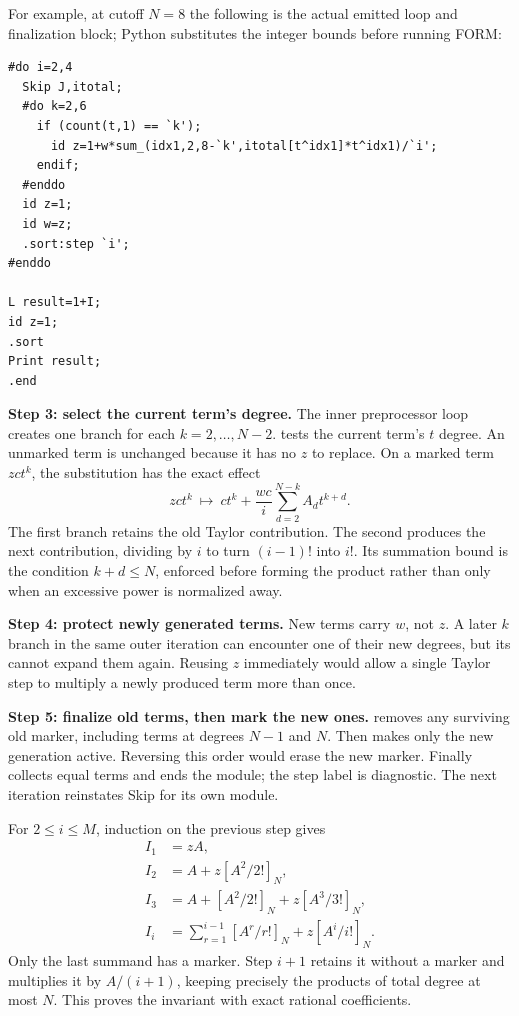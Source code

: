 \clearpage
{}
For example, at cutoff $N=8$ the following is the actual emitted loop and
finalization block; Python substitutes the integer bounds before running FORM:
\begin{lstlisting}
#do i=2,4
  Skip J,itotal;
  #do k=2,6
    if (count(t,1) == `k');
      id z=1+w*sum_(idx1,2,8-`k',itotal[t^idx1]*t^idx1)/`i';
    endif;
  #enddo
  id z=1;
  id w=z;
  .sort:step `i';
#enddo

L result=1+I;
id z=1;
.sort
Print result;
.end
\end{lstlisting}
\textbf{Step 3: select the current term's degree.}
The inner preprocessor loop creates one branch for each $k=2,\ldots,N-2$.
 tests the current term's $t$ degree. An unmarked term is
unchanged because it has no $z$ to replace. On a marked term $zct^k$, the
substitution has the exact effect
\[
 zct^k\ \longmapsto\ ct^k+
 \frac{w c}{i}\sum_{d=2}^{N-k}A_d t^{k+d}.
\]
The first branch retains the old Taylor contribution. The second produces
the next contribution, dividing by $i$ to turn $(i-1)!$ into $i!$.
Its summation bound is the condition $k+d\leq N$, enforced before forming
the product rather than only when an excessive power is normalized away.

\textbf{Step 4: protect newly generated terms.}
New terms carry $w$, not $z$. A later $k$ branch in the same outer iteration
can encounter one of their new degrees, but its  cannot expand
them again. Reusing $z$ immediately would allow a single Taylor step to
multiply a newly produced term more than once.

\textbf{Step 5: finalize old terms, then mark the new ones.}
 removes any surviving old marker, including terms at degrees
$N-1$ and $N$. Then  makes only the new generation active.
Reversing this order would erase the new marker. Finally
 collects equal terms and ends the module; the step
label is diagnostic. The next iteration reinstates Skip for its own module.

\clearpage
{}
For $2\leq i\leq M$, induction on the previous step gives
\[
 \begin{aligned}
 I_1&=zA,\\
 I_2&=A+z[A^2/2!]_N,\\
 I_3&=A+[A^2/2!]_N+z[A^3/3!]_N,\\
 I_i&=\sum_{r=1}^{i-1}[A^r/r!]_N+z[A^i/i!]_N.
 \end{aligned}
\]
Only the last summand has a marker. Step $i+1$ retains it without a marker
and multiplies it by $A/(i+1)$, keeping precisely the products of total degree
at most $N$. This proves the invariant with exact rational coefficients.

